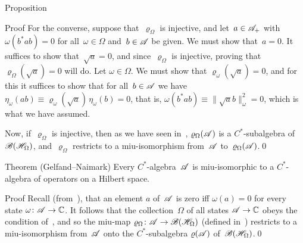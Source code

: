 \documentclass[a]{subfiles}
\begin{document}
\begin{parsec}
\begin{point}{Proposition}
\begin{point}{Proof}
For the converse, suppose that~$\varrho_\Omega$ is injective,
and let~$a\in\mathscr{A}_+$ with $\omega(b^*ab)=0$
for all~$\omega\in\Omega$ and~$b\in\mathscr{A}$ be given.
We must show that~$a=0$.
It suffices to show that~$\sqrt{a}=0$,
and since~$\varrho_\Omega$ is injective,
proving that~$\varrho_\Omega(\sqrt{a})=0$ will do.
Let $\omega\in\Omega$. We must show that
$\varrho_\omega(\sqrt{a})=0$,
and for this it suffices to show that
for all~$b\in \mathscr{A}$ we have
$\eta_\omega(ab)\equiv\varrho_\omega(\sqrt{a})\,\eta_\omega(b)=0$,
that is, $\omega(b^*ab)\equiv\|\sqrt{a}b\|_\omega^2=0$,
which is what we have assumed.

Now, if~$\varrho_\Omega$ is injective,
then as we have seen in~,
$\varrho_\Omega(\mathscr{A})$ is a $C^*$-subalgebra
of~$\mathscr{B}(\mathscr{H}_\Omega)$,
and~$\varrho_\Omega$ restricts to a miu-isomorphism
from~$\mathscr{A}$ to~$\varrho_\Omega(\mathscr{A})$.\qed
\end{point}
\end{point}
\begin{point}{Theorem (Gelfand--Naimark)}%
Every $C^*$-algebra~$\mathscr{A}$ is miu-isomorphic
to a $C^*$-algebra of operators on a Hilbert space.
\begin{point}{Proof}%
	Recall (from~),
	that an element $a$ of~$\mathscr{A}$ is zero
	iff $\omega(a)=0$ for every state $\omega\colon \mathscr{A}\to\mathbb{C}$.
	It follows that the collection~$\Omega$ of all states $\mathscr{A}\to \mathbb{C}$
obeys the condition of~,
and so
the miu-map $\varrho_\Omega\colon \mathscr{A}\to\mathscr{B}(\mathscr{H}_\Omega)$
(defined in~)
restricts to a miu-isomorphism
from~$\mathscr{A}$ onto the $C^*$-subalgebra
$\varrho(\mathscr{A})$ of~$\mathscr{B}(\mathscr{H}_\Omega)$.\qed
\end{point}
\end{point}
\end{parsec}
\end{document}
